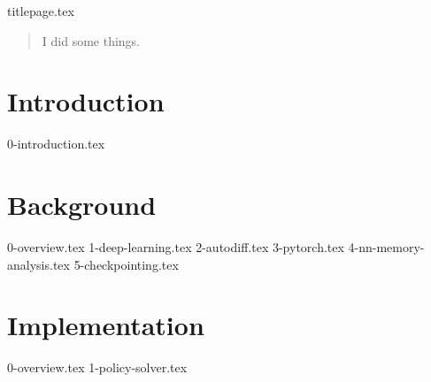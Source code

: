\documentclass[12pt,twoside]{report}
\begin{document}
{titlepage.tex}

\clearpage{\pagestyle{empty}\cleardoublepage}
\setcounter{page}{1}
\pagestyle{fancy}

\begin{abstract}
I did some things.
\end{abstract}

\cleardoublepage


\tableofcontents
\clearpage{\pagestyle{empty}}

\listoffigures
\clearpage{\pagestyle{empty}}

\listoflistings

\listofalgorithms

\clearpage{\pagestyle{empty}\cleardoublepage}
\setcounter{page}{1}
\fancyhead[LE,RO]{\slshape \rightmark}
\fancyhead[LO,RE]{\slshape \leftmark}

\chapter{Introduction}
{0-introduction.tex}

\chapter{Background}
{0-overview.tex}
{1-deep-learning.tex}
{2-autodiff.tex}
{3-pytorch.tex}
{4-nn-memory-analysis.tex}
{5-checkpointing.tex}

\chapter{Implementation}
{0-overview.tex}
{1-policy-solver.tex}
\end{document}

